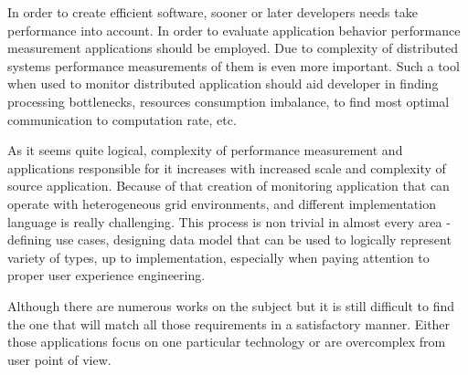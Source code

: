 In order to create efficient software, sooner or later developers needs take performance into account. In order to evaluate application behavior performance measurement applications should be employed. Due to  complexity of distributed systems performance measurements of them is even more important. Such a tool when used to monitor distributed application should aid developer in finding processing bottlenecks, resources consumption imbalance, to find most optimal communication to computation rate, etc. 

As it seems quite logical, complexity of performance measurement and applications responsible for it increases with increased scale and complexity of source application. Because of that creation of monitoring application that can operate with heterogeneous grid environments, and different implementation language is really challenging. This process is non trivial in almost every area - defining use cases, designing data model that can be used to logically represent variety of types, up to implementation, especially when paying attention to proper user experience engineering.

Although there are numerous works on the subject but it is still difficult to find the one that will match all those requirements in a satisfactory manner. Either those applications focus on one particular technology or are overcomplex from user point of view. 




 

